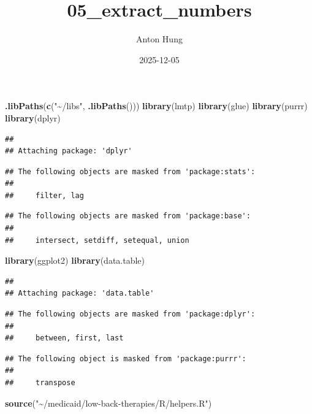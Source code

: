 \documentclass[
]{article}
\title{05\_extract\_numbers}
\author{Anton Hung}
\date{2025-12-05}
\newenvironment{Shaded}{\begin{snugshade}}{\end{snugshade}}
\newcommand{\FunctionTok}[1]{\textcolor[rgb]{0.13,0.29,0.53}{\textbf{#1}}}
\newcommand{\NormalTok}[1]{#1}
\newcommand{\StringTok}[1]{\textcolor[rgb]{0.31,0.60,0.02}{#1}}
\begin{document}
\maketitle

\begin{Shaded}
\begin{Highlighting}[]
\FunctionTok{.libPaths}\NormalTok{(}\FunctionTok{c}\NormalTok{(}\StringTok{"\textasciitilde{}/libs"}\NormalTok{, }\FunctionTok{.libPaths}\NormalTok{()))}
\FunctionTok{library}\NormalTok{(lmtp)}
\FunctionTok{library}\NormalTok{(glue)}
\FunctionTok{library}\NormalTok{(purrr)}
\FunctionTok{library}\NormalTok{(dplyr)}
\end{Highlighting}
\end{Shaded}

\begin{verbatim}
## 
## Attaching package: 'dplyr'
\end{verbatim}

\begin{verbatim}
## The following objects are masked from 'package:stats':
## 
##     filter, lag
\end{verbatim}

\begin{verbatim}
## The following objects are masked from 'package:base':
## 
##     intersect, setdiff, setequal, union
\end{verbatim}

\begin{Shaded}
\begin{Highlighting}[]
\FunctionTok{library}\NormalTok{(ggplot2)}
\FunctionTok{library}\NormalTok{(data.table)}
\end{Highlighting}
\end{Shaded}

\begin{verbatim}
## 
## Attaching package: 'data.table'
\end{verbatim}

\begin{verbatim}
## The following objects are masked from 'package:dplyr':
## 
##     between, first, last
\end{verbatim}

\begin{verbatim}
## The following object is masked from 'package:purrr':
## 
##     transpose
\end{verbatim}

\begin{Shaded}
\begin{Highlighting}[]
\FunctionTok{source}\NormalTok{(}\StringTok{"\textasciitilde{}/medicaid/low{-}back{-}therapies/R/helpers.R"}\NormalTok{)}
\end{Highlighting}
\end{Shaded}
\end{document}
